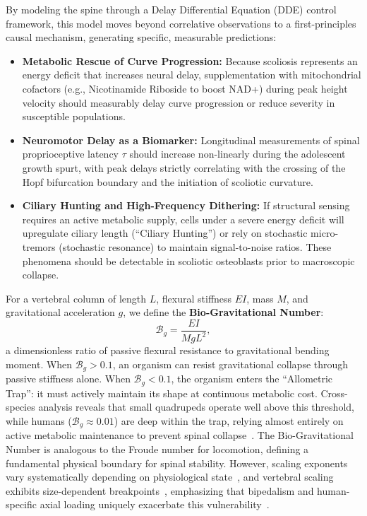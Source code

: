 \documentclass[11pt]{article}
\begin{document}
By modeling the spine through a Delay Differential Equation (DDE) control framework, this model moves beyond correlative observations to a first-principles causal mechanism, generating specific, measurable predictions:

\begin{itemize}
    \item \textbf{Metabolic Rescue of Curve Progression:} Because scoliosis represents an energy deficit that increases neural delay, supplementation with mitochondrial cofactors (e.g., Nicotinamide Riboside to boost NAD+) during peak height velocity should measurably delay curve progression or reduce severity in susceptible populations.
    \item \textbf{Neuromotor Delay as a Biomarker:} Longitudinal measurements of spinal proprioceptive latency $\tau$ should increase non-linearly during the adolescent growth spurt, with peak delays strictly correlating with the crossing of the Hopf bifurcation boundary and the initiation of scoliotic curvature.
    \item \textbf{Ciliary Hunting and High-Frequency Dithering:} If structural sensing requires an active metabolic supply, cells under a severe energy deficit will upregulate ciliary length (``Ciliary Hunting'') or rely on stochastic micro-tremors (stochastic resonance) to maintain signal-to-noise ratios. These phenomena should be detectable in scoliotic osteoblasts prior to macroscopic collapse.
\end{itemize}

For a vertebral column of length $L$, flexural stiffness $EI$, mass $M$, and gravitational acceleration $g$, we define the \textbf{Bio-Gravitational Number}:
\begin{equation}
\mathcal{B}_g = \frac{EI}{M g L^2},
\label{eq:bg_number}
\end{equation}
a dimensionless ratio of passive flexural resistance to gravitational bending moment. When $\mathcal{B}_g > 0.1$, an organism can resist gravitational collapse through passive stiffness alone. When $\mathcal{B}_g < 0.1$, the organism enters the ``Allometric Trap'': it must actively maintain its shape at continuous metabolic cost. Cross-species analysis reveals that small quadrupeds operate well above this threshold, while humans ($\mathcal{B}_g \approx 0.01$) are deep within the trap, relying almost entirely on active metabolic maintenance to prevent spinal collapse~\cite{smit2020adolescent}. The Bio-Gravitational Number is analogous to the Froude number for locomotion, defining a fundamental physical boundary for spinal stability. However, scaling exponents vary systematically depending on physiological state~\cite{glazier2022variable}, and vertebral scaling exhibits size-dependent breakpoints~\cite{smith2024small}, emphasizing that bipedalism and human-specific axial loading uniquely exacerbate this vulnerability~\cite{gorman2009idiopathic}.
\end{document}
